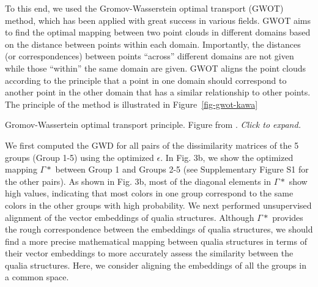 \documentclass[
  authoryear]{elsarticle}
\begin{document}
To this end, we used the Gromov-Wasserstein optimal transport (GWOT)
method, which has been applied with great success in various fields.
GWOT aims to find the optimal mapping between two point clouds in
different domains based on the distance between points within each
domain. Importantly, the distances (or correspondences) between points
``across'' different domains are not given while those ``within'' the
same domain are given. GWOT aligns the point clouds according to the
principle that a point in one domain should correspond to another point
in the other domain that has a similar relationship to other points. The
principle of the method is illustrated in Figure~\ref{fig-gwot-kawa}

\begin{marginfigure}


\caption{\label{fig-gwot-kawa}Gromov-Wassertein optimal transport
principle. Figure from \citet{kawakita2023}. \emph{Click to expand.}}

\end{marginfigure}%

We first computed the GWD for all pairs of the dissimilarity matrices of
the 5 groups (Group 1-5) using the optimized \(\epsilon\). In Fig. 3b,
we show the optimized mapping \(\Gamma*\) between Group 1 and Groups 2-5
(see Supplementary Figure S1 for the other pairs). As shown in Fig. 3b,
most of the diagonal elements in \(\Gamma*\) show high values,
indicating that most colors in one group correspond to the same colors
in the other groups with high probability. We next performed
unsupervised alignment of the vector embeddings of qualia structures.
Although \(\Gamma*\) provides the rough correspondence between the
embeddings of qualia structures, we should find a more precise
mathematical mapping between qualia structures in terms of their vector
embeddings to more accurately assess the similarity between the qualia
structures. Here, we consider aligning the embeddings of all the groups
in a common space.
\end{document}
